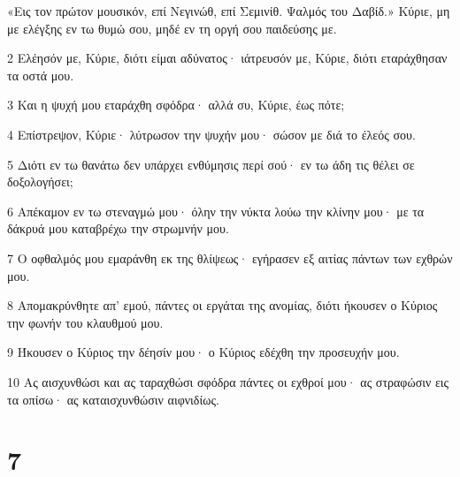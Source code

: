 \par «Εις τον πρώτον μουσικόν, επί Νεγινώθ, επί Σεμινίθ. Ψαλμός του Δαβίδ.» Κύριε, μη με ελέγξης εν τω θυμώ σου, μηδέ εν τη οργή σου παιδεύσης με.
\par 2 Ελέησόν με, Κύριε, διότι είμαι αδύνατος· ιάτρευσόν με, Κύριε, διότι εταράχθησαν τα οστά μου.
\par 3 Και η ψυχή μου εταράχθη σφόδρα· αλλά συ, Κύριε, έως πότε;
\par 4 Επίστρεψον, Κύριε· λύτρωσον την ψυχήν μου· σώσον με διά το έλεός σου.
\par 5 Διότι εν τω θανάτω δεν υπάρχει ενθύμησις περί σού· εν τω άδη τις θέλει σε δοξολογήσει;
\par 6 Απέκαμον εν τω στεναγμώ μου· όλην την νύκτα λούω την κλίνην μου· με τα δάκρυά μου καταβρέχω την στρωμνήν μου.
\par 7 Ο οφθαλμός μου εμαράνθη εκ της θλίψεως· εγήρασεν εξ αιτίας πάντων των εχθρών μου.
\par 8 Απομακρύνθητε απ' εμού, πάντες οι εργάται της ανομίας, διότι ήκουσεν ο Κύριος την φωνήν του κλαυθμού μου.
\par 9 Ήκουσεν ο Κύριος την δέησίν μου· ο Κύριος εδέχθη την προσευχήν μου.
\par 10 Ας αισχυνθώσι και ας ταραχθώσι σφόδρα πάντες οι εχθροί μου· ας στραφώσιν εις τα οπίσω· ας καταισχυνθώσιν αιφνιδίως.

\chapter{7}

